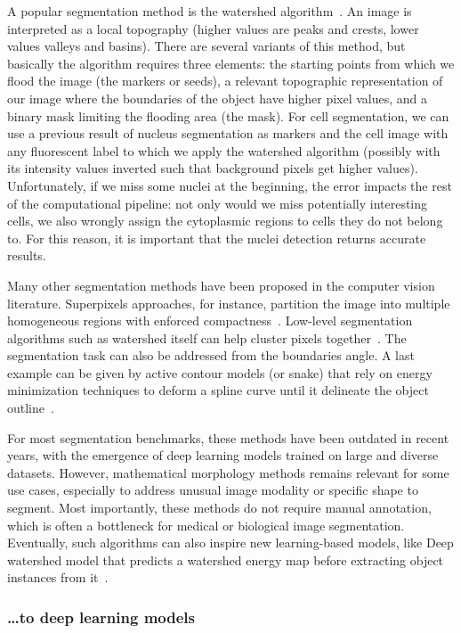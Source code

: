A popular segmentation method is the watershed algorithm~\cite{Vincent_1991}.
An image is interpreted as a local topography (higher values are peaks and crests, lower values valleys and basins).
There are several variants of this method, but basically the algorithm requires three elements: the starting points from which we flood the image (the markers or seeds), a relevant topographic representation of our image where the boundaries of the object have higher pixel values, and a binary mask limiting the flooding area (the mask).
For cell segmentation, we can use a previous result of nucleus segmentation as markers and the cell image with any fluorescent label to which we apply the watershed algorithm (possibly with its intensity values inverted such that background pixels get higher values).
Unfortunately, if we miss some nuclei at the beginning, the error impacts the rest of the computational pipeline: not only would we miss potentially interesting cells, we also wrongly assign the cytoplasmic regions to cells they do not belong to.
For this reason, it is important that the nuclei detection returns accurate results.

Many other segmentation methods have been proposed in the computer vision literature.
Superpixels approaches, for instance, partition the image into multiple homogeneous regions with enforced compactness~\cite{Ren_2003}.
Low-level segmentation algorithms such as watershed itself can help cluster pixels together~\cite{Machairas_2014}.
The segmentation task can also be addressed from the boundaries angle.
A last example can be given by active contour models (or snake) that rely on energy minimization techniques to deform a spline curve until it delineate the object outline~\cite{kass_snakes_1988}.

For most segmentation benchmarks, these methods have been outdated in recent years, with the emergence of deep learning models trained on large and diverse datasets.
However, mathematical morphology methods remains relevant for some use cases, especially to address unusual image modality or specific shape to segment.
Most importantly, these methods do not require manual annotation, which is often a bottleneck for medical or biological image segmentation.
Eventually, such algorithms can also inspire new learning-based models, like Deep watershed model that predicts a watershed energy map before extracting object instances from it~\cite{Bai_2017_CVPR}.

\subsubsection{\dots to deep learning models}

